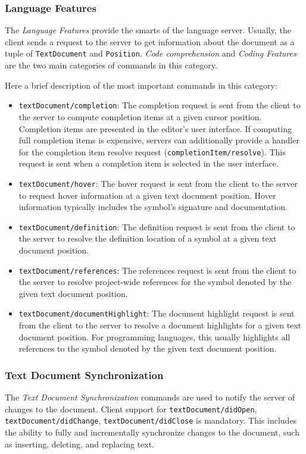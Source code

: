 \subsubsection{Language Features}\label{subsec:background:LanguageFeatures}
The \textit{Language Features} provide the smarts of the language server. Usually, the client sends a request to the server to get information about the document as a tuple of \texttt{TextDocument} and \texttt{Position}. \textit{Code comprehension} and \textit{Coding Features} are the two main categories of commands in this category.

Here a brief description of the most important commands in this category:
\begin{itemize}
    \item \texttt{textDocument/completion}: The completion request is sent from the client to the server to compute completion items at a given cursor position. Completion items are presented in the editor's user interface. If computing full completion items is expensive, servers can additionally provide a handler for the completion item resolve request (\texttt{completionItem/resolve}). This request is sent when a completion item is selected in the user interface.
    \item \texttt{textDocument/hover}: The hover request is sent from the client to the server to request hover information at a given text document position. Hover information typically includes the symbol's signature and documentation.
    \item \texttt{textDocument/definition}: The definition request is sent from the client to the server to resolve the definition location of a symbol at a given text document position.
    \item \texttt{textDocument/references}: The references request is sent from the client to the server to resolve project-wide references for the symbol denoted by the given text document position.
    \item \texttt{textDocument/documentHighlight}: The document highlight request is sent from the client to the server to resolve a document highlights for a given text document position. For programming languages, this usually highlights all references to the symbol denoted by the given text document position.
\end{itemize}

\subsubsection{Text Document Synchronization}\label{subsec:background:TextDocumentSynchronization}
The \textit{Text Document Synchronization} commands are used to notify the server of changes to the document. Client support for \texttt{textDocument/didOpen}, \texttt{textDocument/didChange}, \texttt{textDocument/didClose} is mandatory. This includes the ability to fully and incrementally synchronize changes to the document, such as inserting, deleting, and replacing text.

